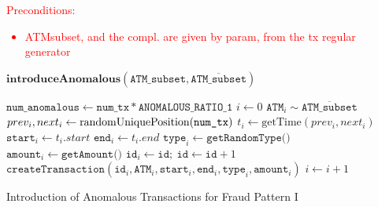 \textcolor{red}{Preconditions:
\begin{itemize}
  \item ATMsubset, and the compl. are given by param, from the tx regular generator
\end{itemize}
}

\begin{algorithm}[H]
  \small
  $\textbf{introduceAnomalous}(\texttt{ATM\_subset}, \overline{\texttt{ATM\_subset}})$
  \begin{algorithmic}[1]
  \STATE $\texttt{num\_anomalous} \gets \texttt{num\_tx} * \texttt{ANOMALOUS\_RATIO\_1}$
  \STATE $i \gets 0$
      \STATE $\texttt{ATM}_{i} \sim \overline{\texttt{ATM\_subset}}$
      \STATE $prev_i, next_i \gets \text{randomUniquePosition(\texttt{num\_tx})}$
      \STATE $t_i \gets \text{getTime}(prev_i, next_i)$
      \STATE $\texttt{start}_{i} \gets t_i.start$
      \STATE $\texttt{end}_{i} \gets t_i.end$
      \STATE $\texttt{type}_{i} \gets \texttt{getRandomType()}$
      \STATE $\texttt{amount}_{i} \gets \texttt{getAmount()}$
      \STATE $\texttt{id}_{i} \gets \texttt{id}; \ \texttt{id} \gets \texttt{id} + 1$
      \STATE $\texttt{createTransaction}(\texttt{id}_{i}, \texttt{ATM}_i, \texttt{start}_{i},\texttt{end}_{i}, \texttt{type}_{i}, \texttt{amount}_i)$
      \STATE $i \gets i + 1$
  \ENDWHILE
  \end{algorithmic}
  \caption{Introduction of Anomalous Transactions for Fraud Pattern I}
  \label{alg:anomalous-tx-generator-1}
\end{algorithm}


